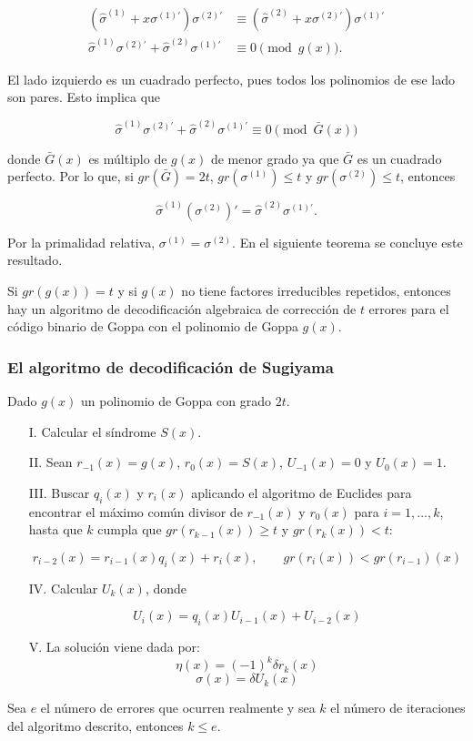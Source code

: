 \begin{align*} 
    \left( \hat{\sigma}^{(1)} + x \sigma^{(1)'} \right) \sigma^{(2)'} &\equiv \left( \hat{\sigma}^{(2)} + x \sigma^{(2)'} \right) \sigma^{(1)'}\\ 
    \hat{\sigma}^{(1)} \sigma^{(2)'} + \hat{\sigma}^{(2)} \sigma^{(1)'} &\equiv 0 \pmod{g(x)}.
\end{align*}

El lado izquierdo es un cuadrado perfecto, pues todos los polinomios de ese lado son pares. Esto implica que

$$\hat{\sigma}^{(1)} \sigma^{(2)'} + \hat{\sigma}^{(2)} \sigma^{(1)'} \equiv 0 \pmod{\bar{G}(x)}$$

donde $\bar{G}(x)$ es múltiplo de $g(x)$ de menor grado ya que $\bar{G}$ es un cuadrado perfecto. Por lo que, si $gr(\bar{G}) = 2t$, $gr(\sigma^{(1)}) \leq t$ y $gr(\sigma^{(2)}) \leq t$, entonces 

$$\hat{\sigma}^{(1)} \left( \sigma^{(2)} \right) ' = \hat{\sigma}^{(2)} \sigma^{(1)'}.$$

Por la primalidad relativa, $\sigma^{(1)} = \sigma^{(2)}$. En el siguiente teorema se concluye este resultado.

\begin{theorem}
    Si $gr(g(x)) = t$ y si $g(x)$ no tiene factores irreducibles repetidos, entonces hay un algoritmo de decodificación algebraica de corrección de $t$ errores para el código binario de Goppa con el polinomio de Goppa $g(x)$.
\end{theorem}

\subsubsection{El algoritmo de decodificación de Sugiyama}

Dado $g(x)$ un polinomio de Goppa con grado $2t$.

\begin{itemize}
    \item[I.] Calcular el síndrome $S(x)$.
    \item[II.] Sean $r_{-1}(x) = g(x)$, $r_0(x) = S(x)$, $U_{-1}(x) = 0$ y $U_0(x) = 1$.
    \item[III.] Buscar $q_i(x)$ y $r_i(x)$ aplicando el algoritmo de Euclides para encontrar el máximo común divisor de $r_{-1}(x)$ y $r_0(x)$ para $i = 1,..., k$, hasta que $k$ cumpla que $gr(r_{k-1}(x)) \geq t$ y $gr(r_k(x)) < t$:

        $$r_{i-2}(x) = r_{i-1}(x) q_i(x) + r_i(x), \qquad gr(r_i(x)) < gr(r_{i-1})(x)$$
    
    \item[IV.] Calcular $U_k(x)$, donde
    
        $$U_i(x) = q_i(x) U_{i-1}(x) + U_{i-2}(x)$$

    \item[V.] La solución viene dada por:
        $$\eta(x) = (-1)^k \delta r_k(x)$$
        $$\sigma(x) = \delta U_k(x)$$
\end{itemize}

\begin{proposition}
    Sea $e$ el número de errores que ocurren realmente y sea $k$ el número de iteraciones del algoritmo descrito, entonces $k \leq e$.
\end{proposition}